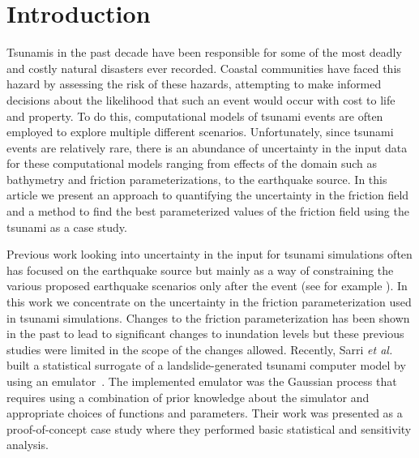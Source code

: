 
\section{Introduction}

Tsunamis in the past decade have been responsible for some of the most deadly and costly natural disasters ever recorded.  Coastal communities have faced this hazard by assessing the risk of these hazards, attempting to make informed decisions about the likelihood that such an event would occur with cost to life and property.  To do this, computational models of tsunami events are often employed to explore multiple different scenarios.  Unfortunately, since tsunami events are relatively rare, there is an abundance of uncertainty in the input data for these computational models ranging from effects of the domain such as bathymetry and friction parameterizations, to the earthquake source.  In this article we present an approach to quantifying the uncertainty in the friction field and a method to find the best parameterized values of the friction field using the \tohoku tsunami as a case study.

Previous work looking into uncertainty in the input for tsunami simulations often has focused on the earthquake source but mainly as a way of constraining the various proposed earthquake scenarios only after the event (see for example \cite{MacInnes:2013cr}).  In this work we concentrate on the uncertainty in the friction parameterization used in tsunami simulations.  Changes to the friction parameterization has been shown in the past to lead to significant changes to inundation levels \cite{Myers:2001el,Jakeman:2010hk} but these previous studies were limited in the scope of the changes allowed.  Recently, Sarri \emph{et al.} built a statistical surrogate of a landslide-generated tsunami computer model by using an emulator~\cite{Sarri2012}. The implemented emulator was the Gaussian process
that requires using a combination of prior knowledge about the simulator and
appropriate choices of functions and parameters. Their work was presented as a proof-of-concept case study
where they performed basic statistical and sensitivity analysis.

